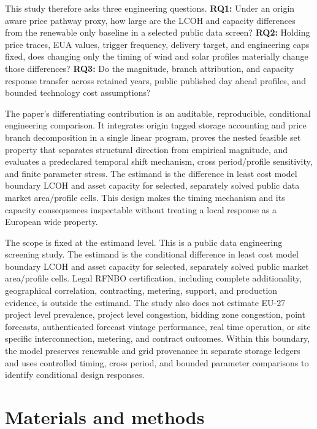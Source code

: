\documentclass[largeformat]{interact}
\begin{document}
This study therefore asks three engineering questions. \textbf{RQ1:}
Under an origin aware price pathway proxy, how large are the LCOH and
capacity differences from the renewable only baseline in a selected
public data screen? \textbf{RQ2:} Holding price traces, EUA values,
trigger frequency, delivery target, and engineering caps fixed, does
changing only the timing of wind and solar profiles materially change
those differences? \textbf{RQ3:} Do the magnitude, branch attribution,
and capacity response transfer across retained years, public published
day ahead profiles, and bounded technology cost assumptions?

The paper's differentiating contribution is an auditable, reproducible,
conditional engineering comparison. It integrates origin tagged storage
accounting and price branch decomposition in a single linear program,
proves the nested feasible set property that separates structural
direction from empirical magnitude, and evaluates a predeclared temporal
shift mechanism, cross period/profile sensitivity, and finite parameter
stress. The estimand is the difference in least cost model boundary LCOH
and asset capacity for selected, separately solved public data market
area/profile cells. This design makes the timing mechanism and its
capacity consequences inspectable without treating a local response as a
European wide property.

The scope is fixed at the estimand level. This is a public data
engineering screening study. The estimand is the conditional difference
in least cost model boundary LCOH and asset capacity for selected,
separately solved public market area/profile cells. Legal RFNBO
certification, including complete additionality, geographical
correlation, contracting, metering, support, and production evidence, is
outside the estimand. The study also does not estimate EU-27 project
level prevalence, project level congestion, bidding zone congestion,
point forecasts, authenticated forecast vintage performance, real time
operation, or site specific interconnection, metering, and contract
outcomes. Within this boundary, the model preserves renewable and grid
provenance in separate storage ledgers and uses controlled timing, cross
period, and bounded parameter comparisons to identify conditional design
responses.

\section{Materials and methods}\label{materials-and-methods}
\end{document}
